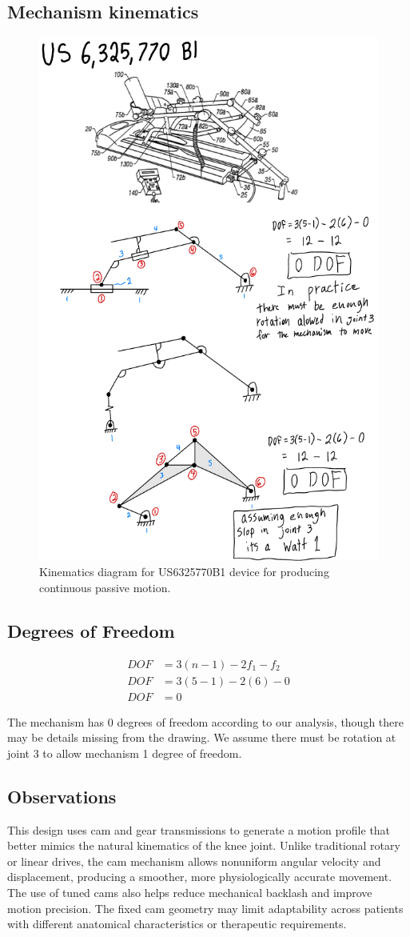 \documentclass[11pt]{article}
\begin{document}
\subsection{Mechanism kinematics}
\begin{figure}[H]
  \centering
  \includegraphics[width=0.54\linewidth]{../Kinematic Mechanism Images/6325770.png}
  \caption{Kinematics diagram for US6325770B1 device for producing continuous passive motion.}
  \label{fig:US6325770B1_kinematics}
\end{figure}

\subsection{Degrees of Freedom}
\[
\begin{aligned}
DOF &= 3(n-1) - 2f_1 - f_2 \\
DOF &= 3(5-1) - 2(6) - 0 \\
DOF &= 0
\end{aligned}
\]

The mechanism has 0 degrees of freedom according to our analysis, though there may be details missing from the drawing. We assume there must be rotation at joint 3 to allow mechanism 1 degree of freedom.

\subsection{Observations}
This design uses cam and gear transmissions to generate a motion profile that better mimics the natural kinematics of the knee joint. Unlike traditional rotary or linear drives, the cam mechanism allows nonuniform angular velocity and displacement, producing a smoother, more physiologically accurate movement. The use of tuned cams also helps reduce mechanical backlash and improve motion precision. The fixed cam geometry may limit adaptability across patients with different anatomical characteristics or therapeutic requirements.
\end{document}
